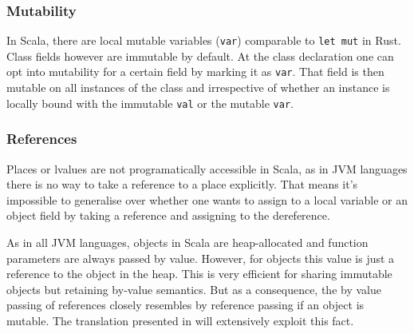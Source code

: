 \subsubsection{Mutability}

In Scala, there are local mutable variables
(\passthrough{\lstinline!var!}) comparable to
\passthrough{\lstinline!let mut!} in Rust. Class fields however are
immutable by default. At the class declaration one can opt into
mutability for a certain field by marking it as
\passthrough{\lstinline!var!}. That field is then mutable on all
instances of the class and irrespective of whether an instance is
locally bound with the immutable \passthrough{\lstinline!val!} or the
mutable \passthrough{\lstinline!var!}.

\subsubsection{References}

Places or lvalues are not programatically accessible in Scala, as in JVM
languages there is no way to take a reference to a place explicitly.
That means it's impossible to generalise over whether one wants to
assign to a local variable or an object field by taking a reference and
assigning to the dereference.

As in all JVM languages, objects in Scala are heap-allocated and
function parameters are always passed by value. However, for objects
this value is just a reference to the object in the heap. This is very
efficient for sharing immutable objects but retaining by-value
semantics. But as a consequence, the by value passing of references
closely resembles by reference passing if an object is mutable. The
translation presented in  will extensively exploit this fact.
